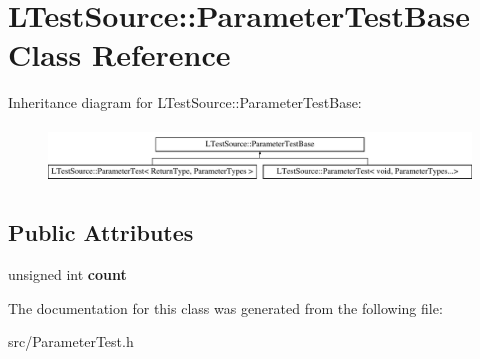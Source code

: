 \hypertarget{class_l_test_source_1_1_parameter_test_base}{\section{L\-Test\-Source\-:\-:Parameter\-Test\-Base Class Reference}
\label{class_l_test_source_1_1_parameter_test_base}
}
Inheritance diagram for L\-Test\-Source\-:\-:Parameter\-Test\-Base\-:\begin{figure}[H]
\begin{center}
\leavevmode
\includegraphics[height=1.521739cm]{class_l_test_source_1_1_parameter_test_base}
\end{center}
\end{figure}
\subsection*{Public Attributes}
\begin{DoxyCompactItemize}
\item 
\hypertarget{class_l_test_source_1_1_parameter_test_base_adf6a9db70c750f78a7dd0ad9779dfeba}{unsigned int {\bfseries count}}\label{class_l_test_source_1_1_parameter_test_base_adf6a9db70c750f78a7dd0ad9779dfeba}

\end{DoxyCompactItemize}


The documentation for this class was generated from the following file\-:\begin{DoxyCompactItemize}
\item 
src/Parameter\-Test.\-h\end{DoxyCompactItemize}
